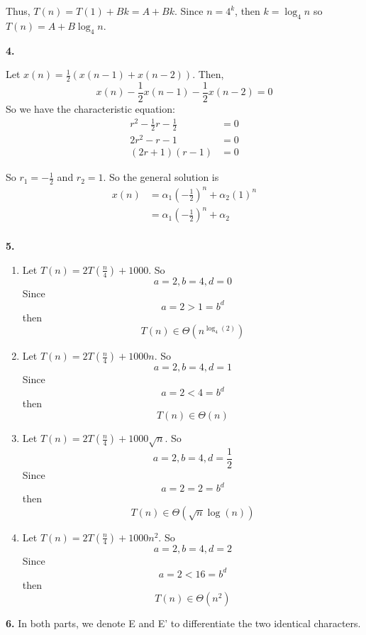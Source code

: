 \documentclass[letterpaper, 11pt]{article}
\newcommand{\hwnumber}[1]{\medskip \noindent\textbf{#1.} \smallskip}
\begin{document}
Thus, \(T(n) = T(1) + Bk = A + Bk\). Since \(n = 4^k\), then \(k = \log_4 n\)
so \(T(n) = A + B\log_4 n\).

\hwnumber{4}

Let \(x(n) = \frac{1}{2}(x(n - 1) + x(n - 2))\). Then,
\[x(n) - \frac{1}{2}x(n - 1) - \frac{1}{2}x(n - 2) = 0\]
So we have the characteristic equation:
\begin{align*}
  r^2 - \frac{1}{2}r - \frac{1}{2} &= 0\\
  2r^2 - r - 1 &= 0 \\
  (2r + 1)(r - 1) &= 0
\end{align*}

So \(r_1 = -\frac{1}{2}\) and \(r_2 = 1\). So the general solution is 
\begin{align*}
  x(n) &= \alpha_1 \left(-\frac{1}{2}\right)^n + \alpha_2(1)^n\\
       &= \alpha_1 \left(-\frac{1}{2}\right)^n + \alpha_2\\
\end{align*}

\newpage
\hwnumber{5}

\begin{enumerate}[label = (\alph*)]
  \item Let \(T(n) = 2T(\frac{n}{4}) + 1000\). So 
    \[a = 2, b = 4, d = 0\]
    Since 
    \[a = 2 > 1 = b^d\]
    then 
    \[T(n) \in \Theta\left(n^{\log_4(2)}\right)\]
  \item Let \(T(n) = 2T(\frac{n}{4}) + 1000n\). So 
    \[a = 2, b = 4, d = 1\]
    Since 
    \[a = 2 < 4 = b^d\]
    then 
    \[T(n) \in \Theta(n)\]
  \item Let \(T(n) = 2T(\frac{n}{4}) + 1000\sqrt{n}\). So 
    \[a = 2, b = 4, d = \frac{1}{2}\]
    Since 
    \[a = 2 = 2 = b^d\]
    then 
    \[T(n) \in \Theta\left(\sqrt{n}\log(n)\right)\]
  \item Let \(T(n) = 2T(\frac{n}{4}) + 1000n^2\). So 
    \[a = 2, b = 4, d = 2\]
    Since 
    \[a = 2 < 16 = b^d\]
    then 
    \[T(n) \in \Theta\left(n^2\right)\]
\end{enumerate}

\newpage
\hwnumber{6}
In both parts, we denote E and E' to differentiate the two identical
characters. 
\end{document}
